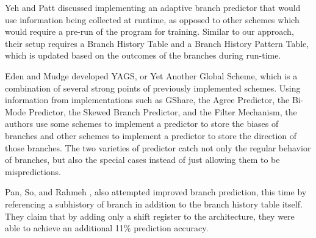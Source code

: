 \documentclass[conference]{IEEEtran}
\begin{document}
Yeh and Patt \cite{Yeh91} discussed implementing an adaptive branch predictor that would use information being collected at runtime, as opposed to other schemes which would require a pre-run of the program for training.  Similar to our approach, their setup requires a Branch History Table and a Branch History Pattern Table, which is updated based on the outcomes of the branches during run-time.

Eden and Mudge \cite{yags98} developed YAGS, or Yet Another Global Scheme, which is a combination of several strong points of previously implemented schemes.  Using information from implementations such as GShare, the 
Agree Predictor, the Bi-Mode Predictor, the Skewed Branch Predictor, and the Filter Mechanism, the authors 
use some schemes to implement a predictor to store the biases of branches and other schemes to implement a predictor to store the 
direction of those branches.  The two varieties of predictor catch not only the regular behavior of branches, but also the special cases instead of just allowing them to be mispredictions.

Pan, So, and Rahmeh \cite{Pan92}, also attempted improved branch prediction, this time by referencing a subhistory of branch in addition to the branch history table itself.  They claim that by adding only a shift register to the architecture, they were able to achieve an additional 11\% prediction accuracy.



\end{document}
